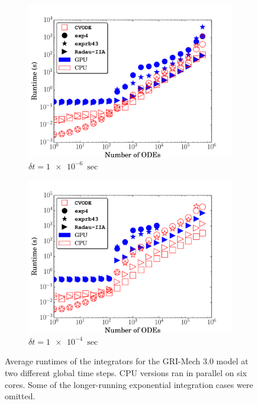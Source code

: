 \documentclass[final,twocolumn]{elsarticle}
\begin{document}
\begin{figure}[htb]
  \ifmeasure
  \fontsize{8pt}{10pt}\selectfont
  \fi
  \centering
  \begin{subfigure}{0.49\textwidth}
      \includegraphics[width=\linewidth]{GRI_1e-06_cpuvsgpu.pdf}
      \caption{$\delta t = \SI{1e-6}{\sec}$}
  \end{subfigure}
  \begin{subfigure}{0.49\textwidth}
      \includegraphics[width=\linewidth]{GRI_1e-04_cpuvsgpu.pdf}
      \caption{$\delta t = \SI{1e-4}{\sec}$}
  \end{subfigure}
  \caption{Average runtimes of the integrators for the GRI-Mech 3.0 model at two different global time steps. 
  CPU versions ran in parallel on six cores.
  Some of the longer-running exponential integration cases were omitted.}
  \label{F:GRI_perf}
\end{figure}
\end{document}
